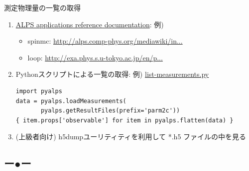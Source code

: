 \begin{frame}[t,fragile]{測定物理量の一覧の取得}
  \begin{enumerate}
    \setlength{\itemsep}{1em}
  \item \href{http://alps.comp-phys.org/mediawiki/index.php/ALPS_2_Documentation:Overview}{ALPS applications reference documentation}: 例)
    \begin{itemize}
    \item spinmc: {\footnotesize \href{http://alps.comp-phys.org/mediawiki/index.php/Documentation:ClassicalMCSimulations}{http://alps.comp-phys.org/mediawiki/in...}}
    \item loop: {\footnotesize \href{http://exa.phys.s.u-tokyo.ac.jp/en/projects/alps-looper}{http://exa.phys.s.u-tokyo.ac.jp/en/p...}}
    \end{itemize}
  \item Pythonスクリプトによる一覧の取得: 例) \href{https://gist.github.com/wistaria/71cb8d7a22f45bfe256d}{list-measurements.py}
\begin{lstlisting}
import pyalps
data = pyalps.loadMeasurements(
       pyalps.getResultFiles(prefix='parm2c'))
{ item.props['observable'] for item in pyalps.flatten(data) }
\end{lstlisting}
  \item (上級者向け) h5dumpユーリティティを利用して *.h5 ファイルの中を見る
  \end{enumerate}
\end{frame}

\subsection*{{\protect\color{red}ー}{\protect\color{blue}●}{\protect\color{green}ー}}

